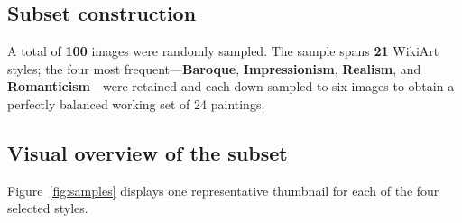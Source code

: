 \documentclass[11pt]{article}
\begin{document}
\subsection{Subset construction}
A total of \textbf{100} images were randomly sampled. The sample spans \textbf{21} WikiArt styles; the four most
frequent—\textbf{Baroque}, \textbf{Impressionism}, \textbf{Realism}, and \textbf{Romanticism}—were retained
and each down‑sampled to six images to obtain a perfectly balanced working set of \num{24} paintings.

\subsection{Visual overview of the subset}
Figure~\ref{fig:samples} displays one representative thumbnail for each of the four selected styles.
\end{document}

